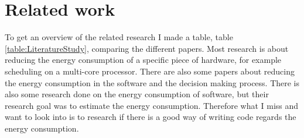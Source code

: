 \chapter{Related work}
\label{ch:related_work}

To get an overview of the related research I made a table, table \ref{table:LiteratureStudy}, comparing the different papers. Most research is about reducing the energy consumption of a specific piece of hardware, for example scheduling on a multi-core processor. There are also some papers about reducing the energy consumption in the software and the decision making process. There is also some research done on the energy consumption of software, but their research goal was to estimate the energy consumption. Therefore what I miss and want to look into is to research if there is a good way of writing code regards the energy consumption.

